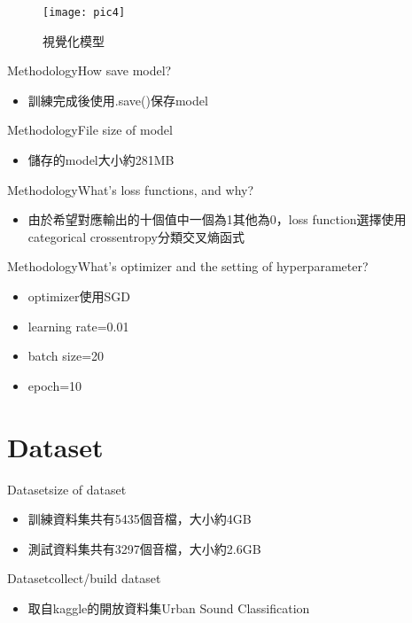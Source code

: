 \documentclass{beamer}
\begin{document}
\begin{CJK}{UTF8}{bsmi}
\begin{frame}
\begin{figure}[H] %
\texttt{[image: pic4]} %
\caption{視覺化模型} %
\end{figure}
\end{frame}
\begin{frame}{Methodology}{How save model? }
  \begin{itemize}
  \item {
    訓練完成後使用.save()保存model
  }
  \end{itemize}
\end{frame}
\begin{frame}{Methodology}{File size of model }
  \begin{itemize}
  \item {
    儲存的model大小約281MB
  }
  \end{itemize}
\end{frame}
\begin{frame}{Methodology}{What’s loss functions, and why? }
  \begin{itemize}
  \item {
   由於希望對應輸出的十個值中一個為1其他為0，loss function選擇使用categorical crossentropy分類交叉熵函式 
  }
  \end{itemize}
\end{frame}
\begin{frame}{Methodology}{What’s optimizer and the setting of hyperparameter? }
  \begin{itemize}
  \item {
    optimizer使用SGD
  }
\item{learning rate=0.01}
\item{batch size=20}
\item{epoch=10}
  \end{itemize}
\end{frame}
\section{Dataset}
\begin{frame}{Dataset}{size of dataset}
  \begin{itemize}
  \item {
    訓練資料集共有5435個音檔，大小約4GB
  }
\item{
測試資料集共有3297個音檔，大小約2.6GB
}
  \end{itemize}
\end{frame}
\begin{frame}{Dataset}{collect/build dataset}
  \begin{itemize}
  \item {
    取自kaggle的開放資料集Urban Sound Classification
  }
  \end{itemize}


\end{frame}
\end{CJK}
\end{document}
